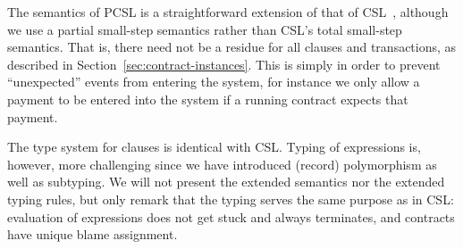 The semantics of PCSL is a straightforward extension of that of
CSL~\cite{hvitved11jlap}, although we use a partial small-step
semantics rather than CSL's total small-step semantics. That is, there
need not be a residue for all clauses and transactions, as described
in Section~\ref{sec:contract-instances}. This is simply in order to
prevent ``unexpected'' events from entering the system, for
instance we only allow a payment to be entered into the system if a
running contract expects that payment.

The type system for clauses is identical with CSL. Typing of
expressions is, however, more challenging since we have introduced
(record) polymorphism as well as subtyping. We will not present the
extended semantics nor the extended typing rules, but only remark that
the typing serves the same purpose as in CSL: evaluation of
expressions does not get stuck and always terminates, and contracts
have unique blame assignment.

